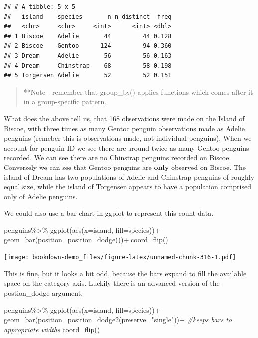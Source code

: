 \documentclass[
]{book}
\newenvironment{Shaded}{\begin{snugshade}}{\end{snugshade}}
\newcommand{\AttributeTok}[1]{\textcolor[rgb]{0.77,0.63,0.00}{#1}}
\newcommand{\CommentTok}[1]{\textcolor[rgb]{0.56,0.35,0.01}{\textit{#1}}}
\newcommand{\FunctionTok}[1]{\textcolor[rgb]{0.00,0.00,0.00}{#1}}
\newcommand{\NormalTok}[1]{#1}
\newcommand{\SpecialCharTok}[1]{\textcolor[rgb]{0.00,0.00,0.00}{#1}}
\newcommand{\StringTok}[1]{\textcolor[rgb]{0.31,0.60,0.02}{#1}}
\begin{document}
\begin{verbatim}
## # A tibble: 5 x 5
##   island    species       n n_distinct  freq
##   <chr>     <chr>     <int>      <int> <dbl>
## 1 Biscoe    Adelie       44         44 0.128
## 2 Biscoe    Gentoo      124         94 0.360
## 3 Dream     Adelie       56         56 0.163
## 4 Dream     Chinstrap    68         58 0.198
## 5 Torgersen Adelie       52         52 0.151
\end{verbatim}

\begin{quote}
**Note - remember that group\_by() applies functions which comes after it in a group-specific pattern.
\end{quote}

What does the above tell us, that 168 observations were made on the Island of Biscoe, with three times as many Gentoo penguin observations made as Adelie penguins (remeber this is observations made, not individual penguins). When we account for penguin ID we see there are around twice as many Gentoo penguins recorded. We can see there are no Chinstrap penguins recorded on Biscoe. Conversely we can see that Gentoo penguins are \textbf{only} observed on Biscoe.
The island of Dream has two populations of Adelie and Chinstrap penguins of roughly equal size, while the island of Torgensen appears to have a population comprised only of Adelie penguins.

We could also use a bar chart in ggplot to represent this count data.

\begin{Shaded}
\begin{Highlighting}[]
\NormalTok{penguins}\SpecialCharTok{\%\textgreater{}\%} 
  \FunctionTok{ggplot}\NormalTok{(}\FunctionTok{aes}\NormalTok{(}\AttributeTok{x=}\NormalTok{island, }\AttributeTok{fill=}\NormalTok{species))}\SpecialCharTok{+}
  \FunctionTok{geom\_bar}\NormalTok{(}\AttributeTok{position=}\FunctionTok{position\_dodge}\NormalTok{())}\SpecialCharTok{+}
  \FunctionTok{coord\_flip}\NormalTok{()}
\end{Highlighting}
\end{Shaded}

\texttt{[image: bookdown-demo\_files/figure-latex/unnamed-chunk-316-1.pdf]}

This is fine, but it looks a bit odd, because the bars expand to fill the available space on the category axis. Luckily there is an advanced version of the postion\_dodge argument.

\begin{Shaded}
\begin{Highlighting}[]
\NormalTok{penguins}\SpecialCharTok{\%\textgreater{}\%} 
  \FunctionTok{ggplot}\NormalTok{(}\FunctionTok{aes}\NormalTok{(}\AttributeTok{x=}\NormalTok{island, }\AttributeTok{fill=}\NormalTok{species))}\SpecialCharTok{+}
  \FunctionTok{geom\_bar}\NormalTok{(}\AttributeTok{position=}\FunctionTok{position\_dodge2}\NormalTok{(}\AttributeTok{preserve=}\StringTok{"single"}\NormalTok{))}\SpecialCharTok{+} 
  \CommentTok{\#keeps bars to appropriate widths}
  \FunctionTok{coord\_flip}\NormalTok{()}
\end{Highlighting}
\end{Shaded}
\end{document}
